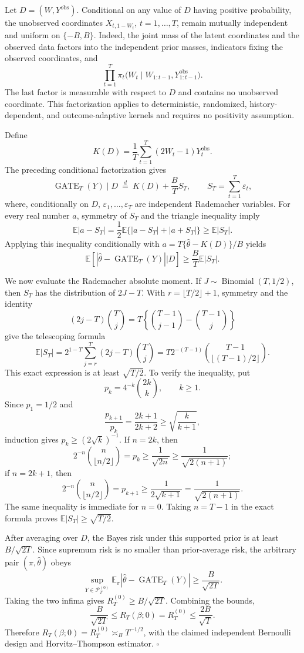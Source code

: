 Let \(D=(W,Y^{\mathrm{obs}})\). Conditional on any value of \(D\) having positive probability, the unobserved coordinates \(X_{t,1-W_t}\), \(t=1,\ldots,T\), remain mutually independent and uniform on \(\{-B,B\}\). Indeed, the joint mass of the latent coordinates and the observed data factors into the independent prior masses, indicators fixing the observed coordinates, and
\[
\prod_{t=1}^T
\pi_t\bigl(W_t\mid W_{1:t-1},Y_{1:t-1}^{\mathrm{obs}}\bigr).
\]
The last factor is measurable with respect to \(D\) and contains no unobserved coordinate. This factorization applies to deterministic, randomized, history-dependent, and outcome-adaptive kernels and requires no positivity assumption.

Define
\[
K(D)=\frac1T\sum_{t=1}^T(2W_t-1)Y_t^{\mathrm{obs}}.
\]
The preceding conditional factorization gives
\[
\operatorname{GATE}_T(Y)\mid D
\ \overset{d}{=}\
K(D)+\frac BT S_T,
\qquad
S_T=\sum_{t=1}^T\varepsilon_t,
\]
where, conditionally on \(D\), \(\varepsilon_1,\ldots,\varepsilon_T\) are independent Rademacher variables. For every real number \(a\), symmetry of \(S_T\) and the triangle inequality imply
\[
\mathbb E|a-S_T|
=\frac12\mathbb E\{|a-S_T|+|a+S_T|\}
\ge\mathbb E|S_T|.
\]
Applying this inequality conditionally with \(a=T\{\widehat\theta-K(D)\}/B\) yields
\[
\mathbb E\left[
\left|\widehat\theta-\operatorname{GATE}_T(Y)\right|
\mathrel{\big|}D
\right]
\ge\frac BT\mathbb E|S_T|.
\]

We now evaluate the Rademacher absolute moment. If \(J\sim\operatorname{Binomial}(T,1/2)\), then \(S_T\) has the distribution of \(2J-T\). With \(r=\lfloor T/2\rfloor+1\), symmetry and the identity
\[
(2j-T)\binom Tj
=T\left\{\binom{T-1}{j-1}-\binom{T-1}{j}\right\}
\]
give the telescoping formula
\[
\mathbb E|S_T|
=2^{1-T}\sum_{j=r}^T(2j-T)\binom Tj
=T2^{-(T-1)}\binom{T-1}{\lfloor(T-1)/2\rfloor}.
\]
This exact expression is at least \(\sqrt{T/2}\). To verify the inequality, put
\[
p_k=4^{-k}\binom{2k}{k},\qquad k\ge1.
\]
Since \(p_1=1/2\) and
\[
\frac{p_{k+1}}{p_k}=\frac{2k+1}{2k+2}
\ge\sqrt{\frac{k}{k+1}},
\]
induction gives \(p_k\ge(2\sqrt{k})^{-1}\). If \(n=2k\), then
\[
2^{-n}\binom n{\lfloor n/2\rfloor}
=p_k\ge\frac1{\sqrt{2n}}
\ge\frac1{\sqrt{2(n+1)}};
\]
if \(n=2k+1\), then
\[
2^{-n}\binom n{\lfloor n/2\rfloor}
=p_{k+1}\ge\frac1{2\sqrt{k+1}}
=\frac1{\sqrt{2(n+1)}}.
\]
The same inequality is immediate for \(n=0\). Taking \(n=T-1\) in the exact formula proves \(\mathbb E|S_T|\ge\sqrt{T/2}\).

After averaging over \(D\), the Bayes risk under this supported prior is at least \(B/\sqrt{2T}\). Since supremum risk is no smaller than prior-average risk, the arbitrary pair \((\pi,\widehat\theta)\) obeys
\[
\sup_{Y\in\mathcal P_T^{(0)}}
\mathbb E_\pi\left|\widehat\theta-\operatorname{GATE}_T(Y)\right|
\ge\frac{B}{\sqrt{2T}}.
\]
Taking the two infima gives \(R_T^{(0)}\ge B/\sqrt{2T}\). Combining the bounds,
\[
\frac{B}{\sqrt{2T}}
\le R_T(\beta;0)=R_T^{(0)}
\le\frac{2B}{\sqrt T}.
\]
Therefore \(R_T(\beta;0)=R_T^{(0)}\asymp_B T^{-1/2}\), with the claimed independent Bernoulli design and Horvitz--Thompson estimator. \(\square\)